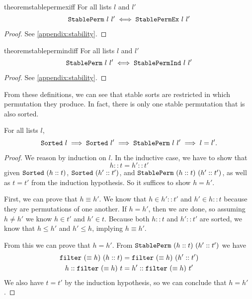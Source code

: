 \documentclass[sigplan,10pt,anonymous,review]{thesis}
\begin{document}
\begin{restatable}{theorem}{stablepermexiff}
  For all lists $l$ and $l'$
  \begin{equation*}
    \texttt{\textup{StablePerm}}~l~l' \iff \texttt{\textup{StablePermEx}}~l~l'
  \end{equation*}
\end{restatable}
\begin{proof}
  See \cref{appendix:stability}.
\end{proof}

\begin{restatable}{theorem}{stablepermindiff}
  For all lists $l$ and $l'$
  \begin{equation*}
    \texttt{\textup{StablePerm}}~l~l' \iff \texttt{\textup{StablePermInd}}~l~l'
  \end{equation*}
\end{restatable}
\begin{proof}
  See \cref{appendix:stability}.
\end{proof}

From these definitions, we can see that stable sorts are restricted in
which permutation they produce. In fact, there is only one stable
permutation that is also sorted.
\begin{theorem}
  For all lists $l$,
  \begin{equation*}
    \texttt{\textup{Sorted}}~l \implies \texttt{\textup{Sorted}}~l' \implies
    \texttt{\textup{StablePerm}}~l~l' \implies l = l'.
  \end{equation*}
\end{theorem}
\begin{proof}
  We reason by induction on $l$. In the inductive case, we have to
  show that
  \begin{equation*}
    h :: t = h' :: t'
  \end{equation*}
  given $\texttt{\textup{Sorted}}~(h :: t)$, $\texttt{\textup{Sorted}}~(h' :: t')$, and
  $\texttt{\textup{StablePerm}}~(h :: t)~(h' :: t')$, as well as $t = t'$ from the
  induction hypothesis. So it suffices to show $h = h'$.

  First, we can prove that $h \equiv h'$. We know that $h \in h' :: t'$ and
  $h' \in h :: t$ because they are permutations of one another. If $h =
  h'$, then we are done, so assuming $h \neq h'$ we know $h \in t'$ and $h'
  \in t$. Because both $h::t$ and $h'::t'$ are sorted, we know that $h \le
  h'$ and $h' \le h$, implying $h \equiv h'$.

  From this we can prove that $h = h'$. From $\texttt{\textup{StablePerm}}~(h ::
  t)~(h' :: t')$ we have
  \begin{align*}
    \texttt{\textup{filter}}~(\equiv h)~(h :: t) &= \texttt{\textup{filter}}~(\equiv h)~(h' :: t') \\
    h :: \texttt{\textup{filter}}~(\equiv h)~t &= h' :: \texttt{\textup{filter}}~(\equiv h)~t'
  \end{align*}
  We also have $t = t'$ by the induction hypothesis, so we can
  conclude that $h = h'$.
\end{proof}
\end{document}
